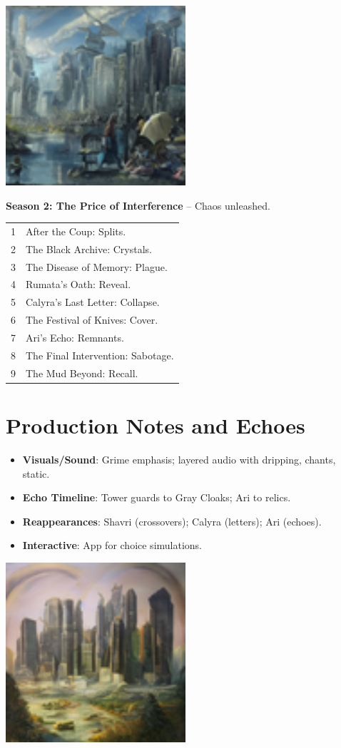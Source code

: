 \documentclass[10pt,letterpaper]{article}
\begin{document}
\begin{center}
\includegraphics[width=0.5\textwidth]{ankyra_image1.jpg} %
{}
\end{center}

\textbf{Season 2: The Price of Interference} – Chaos unleashed.
\begin{longtable}{p{} p{}}
1 & After the Coup: Splits. \\
2 & The Black Archive: Crystals. \\
3 & The Disease of Memory: Plague. \\
4 & Rumata’s Oath: Reveal. \\
5 & Calyra’s Last Letter: Collapse. \\
6 & The Festival of Knives: Cover. \\
7 & Ari’s Echo: Remnants. \\
8 & The Final Intervention: Sabotage. \\
9 & The Mud Beyond: Recall.
\end{longtable}

\section{Production Notes and Echoes}
\begin{itemize}
    \item \textbf{Visuals/Sound}: Grime emphasis; layered audio with dripping, chants, static.
    \item \textbf{Echo Timeline}: Tower guards to Gray Cloaks; Ari to relics.
    \item \textbf{Reappearances}: Shavri (crossovers); Calyra (letters); Ari (echoes).
    \item \textbf{Interactive}: App for choice simulations.
\end{itemize}

\begin{center}
\includegraphics[width=0.5\textwidth]{production_image.jpg} %
{}
\end{center}
\end{document}
